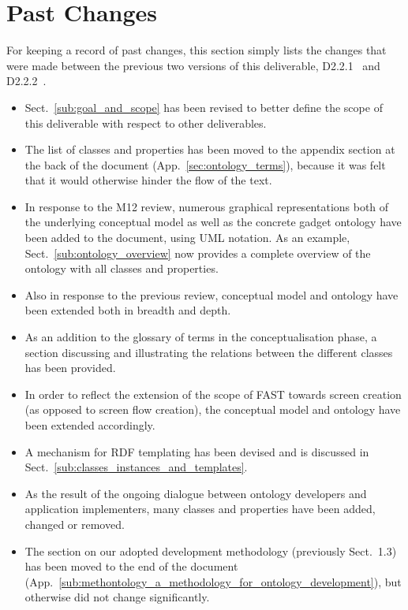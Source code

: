 \documentclass{article}
\begin{document}


\clearpage
{}
\section{Past Changes} %
\label{sec:old_changes}

For keeping a record of past changes, this section simply lists the changes that were made between the previous two versions of this deliverable, D2.2.1~\cite{moeller2009fast_ontology} and D2.2.2~\cite{moeller2010fast_ontology}.

\begin{itemize}
	\item Sect.~\ref{sub:goal_and_scope} has been revised to better define the scope of this deliverable with respect to other deliverables.
	\item The list of classes and properties has been moved to the appendix section at the back of the document (App.~\ref{sec:ontology_terms}), because it was felt that it would otherwise hinder the flow of the text.
	\item In response to the M12 review, numerous graphical representations both of the underlying conceptual model as well as the concrete gadget ontology have been added to the document, using UML notation. As an example, Sect.~\ref{sub:ontology_overview} now provides a complete overview of the ontology with all classes and properties.
	\item Also in response to the previous review, conceptual model and ontology have been extended both in breadth and depth.
	\item As an addition to the glossary of terms in the conceptualisation phase, a section discussing and illustrating the relations between the different classes has been provided.
	\item In order to reflect the extension of the scope of FAST towards screen creation (as opposed to screen flow creation), the conceptual model and ontology have been extended accordingly.
	\item A mechanism for RDF templating has been devised and is discussed in Sect.~\ref{sub:classes_instances_and_templates}.
	\item As the result of the ongoing dialogue between ontology developers and application implementers, many classes and properties have been added, changed or removed.
	\item The section on our adopted development methodology (previously Sect.~1.3) has been moved to the end of the document (App.~\ref{sub:methontology_a_methodology_for_ontology_development}), but otherwise did not change significantly.

\end{itemize}
\end{document}
